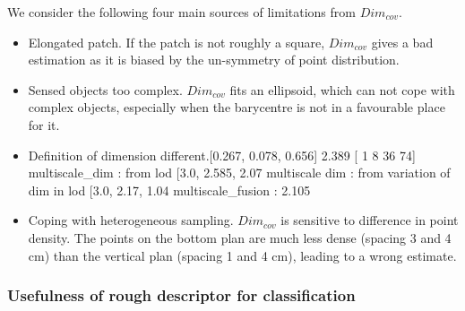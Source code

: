 		We consider the following four main sources of limitations from $Dim_{cov}$.
		\begin{itemize}[noitemsep,topsep=0pt,parsep=0pt,partopsep=0pt]
			\item Elongated patch. If the patch is not roughly a square, $Dim_{cov}$ gives a bad estimation as it is biased by the un-symmetry of point distribution.
			\item Sensed objects too complex. $Dim_{cov}$ fits an ellipsoid, which can not cope with complex objects, especially when the barycentre is not in a favourable place for it.
			\item Definition of dimension different.[0.267, 0.078, 0.656] 2.389  [ 1  8 36 74]
			multiscale_dim : from lod
			[3.0, 2.585, 2.07 
			multiscale dim : from variation of dim in lod
			[3.0, 2.17, 1.04 
			multiscale_fusion : 2.105
			
			\item Coping with heterogeneous sampling. $Dim_{cov}$ is sensitive to difference in point density. The points on the bottom plan are much less dense (spacing 3 and 4 cm) than the vertical plan (spacing 1 and 4 cm), leading to a wrong estimate.
		\end{itemize}
		
		
		
		
		
		
		
		
		
		\subsubsection{Usefulness of rough descriptor for classification}
		
